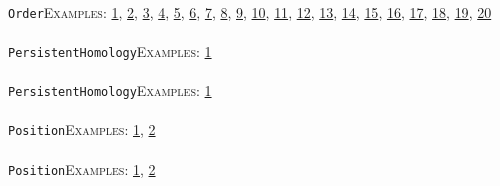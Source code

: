 \documentclass[a4paper,11pt]{report}
\begin{document}
{{ \\
 \texttt{Order}{\nobreakspace}{\nobreakspace}{\nobreakspace}{\nobreakspace}\textsc{Examples:} \href{tutorial/chap3.html} {1}{\nobreakspace}, \href{tutorial/chap6.html} {2}{\nobreakspace}, \href{../www/SideLinks/About/aboutAbelianCategories.html} {3}{\nobreakspace}, \href{../www/SideLinks/About/aboutNonabelian.html} {4}{\nobreakspace}, \href{../www/SideLinks/About/aboutPeriodic.html} {5}{\nobreakspace}, \href{../www/SideLinks/About/aboutCohomologyRings.html} {6}{\nobreakspace}, \href{../www/SideLinks/About/aboutPoincareSeries.html} {7}{\nobreakspace}, \href{../www/SideLinks/About/aboutCoveringSpaces.html} {8}{\nobreakspace}, \href{../www/SideLinks/About/aboutCoverinSpaces.html} {9}{\nobreakspace}, \href{../www/SideLinks/About/aboutPolytopes.html} {10}{\nobreakspace}, \href{../www/SideLinks/About/aboutQuandles.html} {11}{\nobreakspace}, \href{../www/SideLinks/About/aboutCrossedMods.html} {12}{\nobreakspace}, \href{../www/SideLinks/About/aboutquasi.html} {13}{\nobreakspace}, \href{../www/SideLinks/About/aboutSchurMultiplier.html} {14}{\nobreakspace}, \href{../www/SideLinks/About/aboutSimplicialGroups.html} {15}{\nobreakspace}, \href{../www/SideLinks/About/aboutExtensions.html} {16}{\nobreakspace}, \href{../www/SideLinks/About/aboutSpaceGroup.html} {17}{\nobreakspace}, \href{../www/SideLinks/About/aboutSuperperfect.html} {18}{\nobreakspace}, \href{../www/SideLinks/About/aboutGouter.html} {19}{\nobreakspace}, \href{../www/SideLinks/About/aboutTensorSquare.html} {20}{\nobreakspace} \\
 \\
 \texttt{PersistentHomology}{\nobreakspace}{\nobreakspace}{\nobreakspace}{\nobreakspace}\textsc{Examples:} \href{../www/SideLinks/About/aboutPersistent.html} {1}{\nobreakspace} \\
 \\
 \texttt{PersistentHomology}{\nobreakspace}{\nobreakspace}{\nobreakspace}{\nobreakspace}\textsc{Examples:} \href{../www/SideLinks/About/aboutPersistent.html} {1}{\nobreakspace} \\
 \\
 \texttt{Position}{\nobreakspace}{\nobreakspace}{\nobreakspace}{\nobreakspace}\textsc{Examples:} \href{tutorial/chap4.html} {1}{\nobreakspace}, \href{../www/SideLinks/About/aboutTensorSquare.html} {2}{\nobreakspace} \\
 \\
 \texttt{Position}{\nobreakspace}{\nobreakspace}{\nobreakspace}{\nobreakspace}\textsc{Examples:} \href{tutorial/chap4.html} {1}{\nobreakspace}, \href{../www/SideLinks/About/aboutTensorSquare.html} {2}{\nobreakspace} \\
}}
\end{document}
